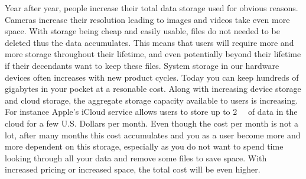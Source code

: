 

Year after year, people increase their total data storage used for obvious reasons. Cameras increase their resolution leading to images and videos take even more space. With storage being cheap and easily usable, files do not needed to be deleted thus the data accumulates. %
This means that users will require more and more storage throughout their lifetime, and even potentially beyond their lifetime if their decendants want to keep these files. System storage in our hardware devices often increases with new product cycles. Today you can keep hundreds of gigabytes in your pocket at a resonable cost. %
Along with increasing device storage and cloud storage, the aggregate storage capacity available to users is increasing. For instance Apple's iCloud service allows users to store up to \SI{2}{\tera\byte} of data in the cloud for a few U.S. Dollars per month. %
Even though the cost per month is not a lot, after many months this cost accumulates and you as a user become more and more dependent on this storage, especially as you do not want to spend time looking through all your data and remove some files to save space. %
With increased pricing or increased space, the total cost will be even higher.

